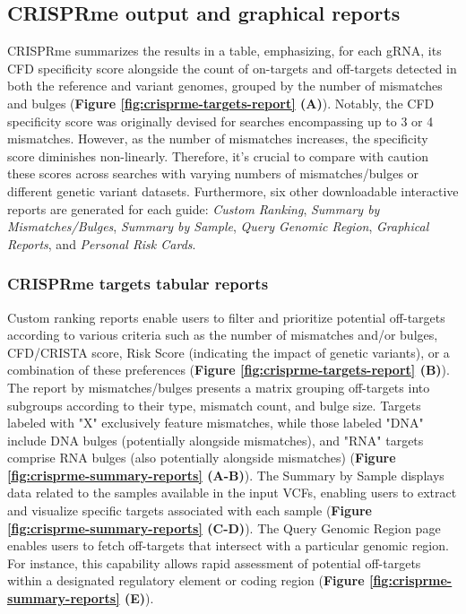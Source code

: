 \documentclass[a4paper, titlepage, openright]{book}
\newcommand{\crisprme}{CRISPRme\xspace}
\begin{document}
\subsection{\crisprme output and graphical reports}
\crisprme summarizes the results in a table, emphasizing, for each gRNA, its CFD specificity score alongside the count of on-targets and off-targets detected in both the reference and variant genomes, grouped by the number of mismatches and bulges (\textbf{Figure \ref{fig:crisprme-targets-report} (A)}). Notably, the CFD specificity score was originally devised for searches encompassing up to 3 or 4 mismatches. However, as the number of mismatches increases, the specificity score diminishes non-linearly. Therefore, it's crucial to compare with caution these scores across searches with varying numbers of mismatches/bulges or different genetic variant datasets. Furthermore, six other downloadable interactive reports are generated for each guide: \emph{Custom Ranking}, \emph{Summary by Mismatches/Bulges}, \emph{Summary by Sample}, \emph{Query Genomic Region}, \emph{Graphical Reports}, and \emph{Personal Risk Cards}. 

\subsubsection{\crisprme targets tabular reports}
Custom ranking reports enable users to filter and prioritize potential off-targets according to various criteria such as the number of mismatches and/or bulges, CFD/CRISTA score, Risk Score (indicating the impact of genetic variants), or a combination of these preferences (\textbf{Figure \ref{fig:crisprme-targets-report} (B)}). The report by mismatches/bulges presents a matrix grouping off-targets into subgroups according to their type, mismatch count, and bulge size. Targets labeled with "X" exclusively feature mismatches, while those labeled "DNA" include DNA bulges (potentially alongside mismatches), and "RNA" targets comprise RNA bulges (also potentially alongside mismatches) (\textbf{Figure \ref{fig:crisprme-summary-reports} (A-B)}). The Summary by Sample displays data related to the samples available in the input VCFs, enabling users to extract and visualize specific targets associated with each sample (\textbf{Figure \ref{fig:crisprme-summary-reports} (C-D)}). The Query Genomic Region page enables users to fetch off-targets that intersect with a particular genomic region. For instance, this capability allows rapid assessment of potential off-targets within a designated regulatory element or coding region (\textbf{Figure \ref{fig:crisprme-summary-reports} (E)}).
 
\end{document}
